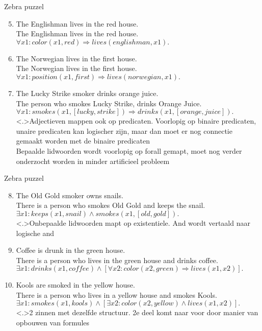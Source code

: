 \documentclass[notes]{beamer}
\newcommand{\hitem}{
	\ppause
	\item
}
\newcommand{\ppause}{\onslide<+>}
\newcommand{\nnote}[1]{\note<.>{#1}}
\begin{document}
  \begin{frame}{Zebra puzzel\cite{ZebraPuzzle}}
    \begin{enumerate}
      \setcounter{enumi}{4}
      \hitem The Englishman lives in the red house. \\ The Englishman lives in the red house. \\ $\forall x1: color(x1,red) \Rightarrow lives(englishman,x1).$ \\
      \item The Norwegian lives in the first house. \\ The Norwegian lives in the first house. \\ $\forall x1: position(x1,first) \Rightarrow lives(norwegian,x1).$ \\
      \item The Lucky Strike smoker drinks orange juice. \\ The person who smokes Lucky Strike, drinks Orange Juice. \\ $\forall x1: smokes(x1,[lucky,strike]) \Rightarrow drinks(x1,[orange,juice]).$ \\
      \nnote{Adjectieven mappen ook op predicaten. Voorlopig op binaire predicaten, unaire predicaten kan logischer zijn, maar dan moet er nog connectie gemaakt worden met de binaire predicaten
      \\ Bepaalde lidwoorden wordt voorlopig op forall gemapt, moet nog verder onderzocht worden in minder artificieel probleem}
    \end{enumerate}
  \end{frame}
  \begin{frame}{Zebra puzzel\cite{ZebraPuzzle}}
    \begin{enumerate}
      \setcounter{enumi}{7}
      \hitem The Old Gold smoker owns snails. \\ There is a person who smokes Old Gold and keeps the snail. \\ $\exists x1: keeps(x1,snail) \land smokes(x1,[old,gold]).$ \\
      \nnote{Onbepaalde lidwoorden mapt op existentiele. And wordt vertaald naar logische and}
      \hitem Coffee is drunk in the green house. \\ There is a person who lives in the green house and drinks coffee. \\ $\exists x1: drinks(x1,coffee) \land [\forall x2: color(x2,green) \Rightarrow lives(x1,x2)].$ \\
      \item Kools are smoked in the yellow house. \\ There is a person who lives in a yellow house and smokes Kools. \\ $\exists x1: smokes(x1,kools) \land [\exists x2: color(x2,yellow) \land lives(x1,x2)].$ \\
      \nnote{2 zinnen met dezelfde structuur. 2e deel komt naar voor door manier van opbouwen van formules}
    \end{enumerate}
  \end{frame}
\end{document}
